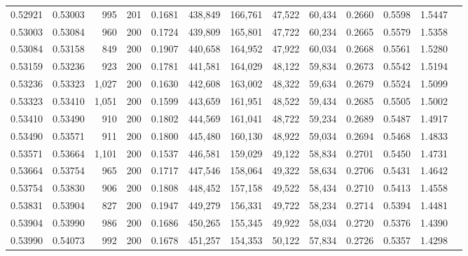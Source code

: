 \begin{tabular}{rrrrrrrrrrrrr}
0.52921 & 0.53003 &   995 & 201 &                                     0.1681 & 438,849 & 166,761 &  47,522 &  60,434 & 0.2660 & 0.5598 & 1.5447 \\
0.53003 & 0.53084 &   960 & 200 &                                     0.1724 & 439,809 & 165,801 &  47,722 &  60,234 & 0.2665 & 0.5579 & 1.5358 \\
0.53084 & 0.53158 &   849 & 200 &                                     0.1907 & 440,658 & 164,952 &  47,922 &  60,034 & 0.2668 & 0.5561 & 1.5280 \\
0.53159 & 0.53236 &   923 & 200 &                                     0.1781 & 441,581 & 164,029 &  48,122 &  59,834 & 0.2673 & 0.5542 & 1.5194 \\
0.53236 & 0.53323 & 1,027 & 200 &                                     0.1630 & 442,608 & 163,002 &  48,322 &  59,634 & 0.2679 & 0.5524 & 1.5099 \\
0.53323 & 0.53410 & 1,051 & 200 &                                     0.1599 & 443,659 & 161,951 &  48,522 &  59,434 & 0.2685 & 0.5505 & 1.5002 \\
0.53410 & 0.53490 &   910 & 200 &                                     0.1802 & 444,569 & 161,041 &  48,722 &  59,234 & 0.2689 & 0.5487 & 1.4917 \\
0.53490 & 0.53571 &   911 & 200 &                                     0.1800 & 445,480 & 160,130 &  48,922 &  59,034 & 0.2694 & 0.5468 & 1.4833 \\
0.53571 & 0.53664 & 1,101 & 200 &                                     0.1537 & 446,581 & 159,029 &  49,122 &  58,834 & 0.2701 & 0.5450 & 1.4731 \\
0.53664 & 0.53754 &   965 & 200 &                                     0.1717 & 447,546 & 158,064 &  49,322 &  58,634 & 0.2706 & 0.5431 & 1.4642 \\
0.53754 & 0.53830 &   906 & 200 &                                     0.1808 & 448,452 & 157,158 &  49,522 &  58,434 & 0.2710 & 0.5413 & 1.4558 \\
0.53831 & 0.53904 &   827 & 200 &                                     0.1947 & 449,279 & 156,331 &  49,722 &  58,234 & 0.2714 & 0.5394 & 1.4481 \\
0.53904 & 0.53990 &   986 & 200 &                                     0.1686 & 450,265 & 155,345 &  49,922 &  58,034 & 0.2720 & 0.5376 & 1.4390 \\
0.53990 & 0.54073 &   992 & 200 &                                     0.1678 & 451,257 & 154,353 &  50,122 &  57,834 & 0.2726 & 0.5357 & 1.4298 \\

\end{tabular}
